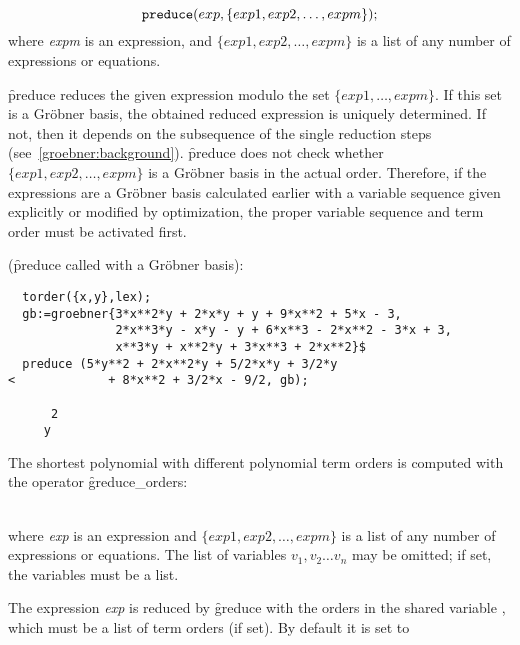 \hypertarget{operator:PREDUCE}{}
\[
 \texttt{preduce}(exp, \{exp1, exp2,\ldots , expm\});
\]
where \emph{expm} is an expression, and $\{exp1, exp2, \ldots ,
expm\}$ is a list of any number of expressions or equations.

\f{preduce} reduces the given expression modulo the set $\{exp1,
\ldots , expm\}$. If this set is a Gr\"obner basis, the obtained reduced
expression is uniquely determined. If not, then it depends on the
subsequence of the single reduction steps
(see~\ref{groebner:background}). \f{preduce} does not check whether
$\{exp1, exp2, \ldots , expm\}$ is a Gr\"obner basis in the actual
order. Therefore, if the expressions are a Gr\"obner basis calculated
earlier with a variable sequence given explicitly or modified by
optimization, the proper variable sequence and term order must
be activated first.

\example (\f{preduce} called with a Gr\"obner basis):
\begin{verbatim}
  torder({x,y},lex);
  gb:=groebner{3*x**2*y + 2*x*y + y + 9*x**2 + 5*x - 3,
               2*x**3*y - x*y - y + 6*x**3 - 2*x**2 - 3*x + 3,
               x**3*y + x**2*y + 3*x**3 + 2*x**2}$
  preduce (5*y**2 + 2*x**2*y + 5/2*x*y + 3/2*y
<             + 8*x**2 + 3/2*x - 9/2, gb);

      2
     y
\end{verbatim}

The shortest polynomial with different polynomial term orders is computed
with the operator \f{greduce\_orders}:

\begin{description}
\item[{\f{greduce\_orders}($exp$, \{$exp1$, $exp2$, \ldots , $expm$\}
    [,\{$v_1,v_2,\ldots,v_n$\}]);}]\mbox{}\\
  \hypertarget{operator:GREDUCE_ORDERS}{}
where {\it exp} is an expression and $\{exp1, exp2,\ldots , expm\}$ is
a list of any number of expressions or equations. The list of variables
$v_1,v_2 \ldots v_n$ may be omitted; if set, the variables must be a list.
\end{description}

\hypertarget{reserved:GORDERS}{}
The expression {\it exp} is reduced by \f{greduce} with the orders
in the shared variable , which must be a list of term
orders (if set). By default it is set to

